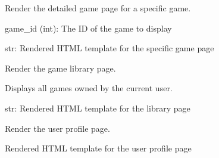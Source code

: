 \documentclass[letterpaper,10pt,english]{sphinxmanual}
\begin{document}

\begin{fulllineitems}
\label{\detokenize{store-service:routes.open_game_page}}
\pysigstartsignatures
\pysiglinewithargsret
{}
{}
{}
\pysigstopsignatures
\sphinxAtStartPar
Render the detailed game page for a specific game.
\begin{description}
\sphinxAtStartPar
game\_id (int): The ID of the game to display

\sphinxAtStartPar
str: Rendered HTML template for the specific game page

\end{description}

\end{fulllineitems}


\begin{fulllineitems}
\label{\detokenize{store-service:routes.open_library_page}}
\pysigstartsignatures
\pysiglinewithargsret
{}
{}
{}
\pysigstopsignatures
\sphinxAtStartPar
Render the game library page.

\sphinxAtStartPar
Displays all games owned by the current user.
\begin{description}
\sphinxAtStartPar
str: Rendered HTML template for the library page

\end{description}

\end{fulllineitems}


\begin{fulllineitems}
\label{\detokenize{store-service:routes.open_profile_page}}
\pysigstartsignatures
\pysiglinewithargsret
{}
{}
{}
\pysigstopsignatures
\sphinxAtStartPar
Render the user profile page.
\begin{description}
\sphinxAtStartPar
Rendered HTML template for the user profile page

\end{description}

\end{fulllineitems}
\end{document}
